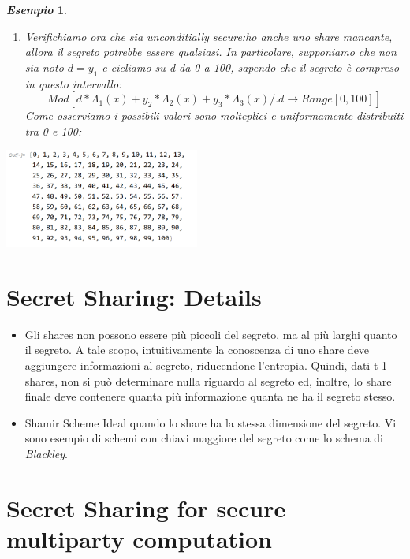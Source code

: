 \documentclass{book}
\newtheorem{esempio}{\emph{Esempio}}
\begin{document}
\begin{esempio}
\begin{enumerate}
\begin{equation*}
              \end{equation*}
        \item Verifichiamo ora che sia unconditially secure: ho anche uno share mancante, allora il segreto potrebbe essere qualsiasi\@. In particolare, supponiamo che non sia noto \(d=y_{1}\) e cicliamo su d da 0 a 100, sapendo che il segreto è compreso in questo intervallo:
              \begin{equation*}
                  Mod[d*\Lambda_{1}(x)+y_{2}*\Lambda_{2}(x)+y_{3}*\Lambda_{3}(x)/.{d\rightarrow Range[0,100]}]
              \end{equation*}
              Come osserviamo i possibili valori sono molteplici e uniformamente distribuiti tra 0 e 100:
    \end{enumerate}
\end{esempio}
\begin{center}
    \includegraphics[width=0.48\textwidth]{2021-12-29-10-57-00.png}%
\end{center}
\section{Secret Sharing: Details}\begin{itemize}
    \item Gli shares non possono essere più piccoli del segreto, ma al più larghi quanto il segreto\@. A tale scopo, intuitivamente la conoscenza di uno share deve aggiungere informazioni al segreto, riducendone l'entropia\@. Quindi, dati t-1 shares, non si può determinare nulla riguardo al segreto ed, inoltre, lo share finale deve contenere quanta più informazione quanta ne ha il segreto stesso\@.
    \item Shamir Scheme Ideal quando lo share ha la stessa dimensione del segreto\@. Vi sono esempio di schemi con chiavi maggiore del segreto come lo schema di \emph{Blackley}\@.
\end{itemize}
\section{Secret Sharing for secure multiparty computation}
\end{document}
